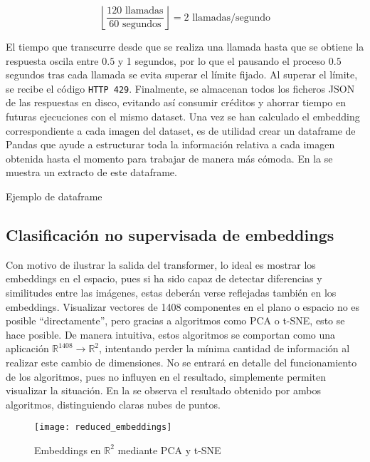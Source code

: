 				$$
				\left\lfloor\frac{120\text{ llamadas}}{60\text{ segundos}}\right\rfloor = 2 \text{ llamadas/segundo}
				$$
				
				El tiempo que transcurre desde que se realiza una llamada hasta que se obtiene la respuesta oscila entre $0.5$ y 1 segundos, por lo que el pausando el proceso $0.5$ segundos tras cada llamada se evita superar el límite fijado. Al superar el límite, se recibe el código \texttt{HTTP 429}. Finalmente, se almacenan todos los ficheros JSON de las respuestas en disco, evitando así consumir  créditos y ahorrar tiempo en futuras ejecuciones con el mismo dataset. Una vez se han calculado el embedding correspondiente a cada imagen del dataset, es de utilidad crear un dataframe de Pandas que ayude a estructurar toda la información relativa a cada imagen obtenida hasta el momento para trabajar de manera más cómoda. En la  se muestra un extracto de este dataframe. 
				
				\begin{table}[!h]
					\scriptsize
					\centering
					\texttt{}
					\caption{Ejemplo de dataframe}
					\label{tab:df_ejemplo}
				\end{table}
				
			\subsection{Clasificación no supervisada de embeddings}
				
				Con motivo de ilustrar la salida del transformer, lo ideal es mostrar los embeddings en el espacio, pues si ha sido capaz de detectar diferencias y similitudes entre las imágenes, estas deberán verse reflejadas también en los embeddings. Visualizar vectores de 1408 componentes en el plano o espacio no es posible ``directamente'', pero gracias a algoritmos como PCA o t-SNE, esto se hace posible. De manera intuitiva, estos algoritmos se comportan como una aplicación $\mathbb{R}^{1408} \longrightarrow \mathbb{R}^2$, intentando perder la mínima cantidad de información al realizar este cambio de dimensiones. No se entrará en detalle del funcionamiento de los algoritmos, pues no influyen en el resultado, simplemente permiten visualizar la situación. En la  se observa el resultado obtenido por ambos algoritmos, distinguiendo claras nubes de puntos. 
				
				\begin{figure}[!h]
					\centering
					\texttt{[image: reduced\_embeddings]}
					\caption{Embeddings en $\mathbb{R}^2$ mediante PCA y t-SNE}
					\label{fig:embeddingsR2}
				\end{figure}
				
